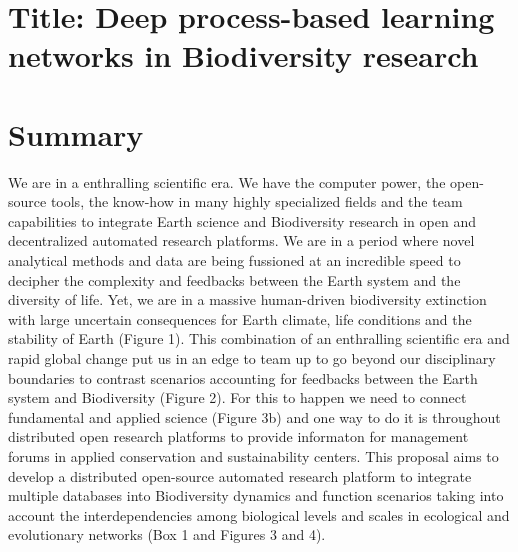\documentclass[authoryear,1p,12pt]{elsarticle}
\begin{document}
\section*{{\bf Title: Deep process-based learning networks in Biodiversity research}}


\section*{{\bf Summary}}
We are in a enthralling scientific era. We have the computer power,
the open-source tools, the know-how in many highly specialized fields
and the team capabilities to integrate Earth science and Biodiversity
research in open and decentralized automated research platforms. We
are in a period where novel analytical methods and data are being
fussioned at an incredible speed to decipher the complexity and
feedbacks between the Earth system and the diversity of life. Yet, we
are in a massive human-driven biodiversity extinction with large
uncertain consequences for Earth climate, life conditions and the
stability of Earth (Figure 1). This combination of an enthralling
scientific era and rapid global change put us in an edge to team up to
go beyond our disciplinary boundaries to contrast scenarios accounting
for feedbacks between the Earth system and Biodiversity (Figure
2). For this to happen we need to connect fundamental and applied
science (Figure 3b) and one way to do it is throughout distributed
open research platforms to provide informaton for management forums in
applied conservation and sustainability centers. This proposal aims to
develop a distributed open-source automated research platform to
integrate multiple databases into Biodiversity dynamics and function
scenarios taking into account the interdependencies among biological
levels and scales in ecological and evolutionary networks (Box 1 and
Figures 3 and 4).



\end{document}
